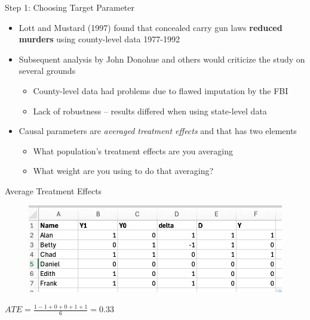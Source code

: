 \documentclass{beamer}
\begin{document}
\begin{frame}{Step 1: Choosing Target Parameter}

\begin{itemize}
\item Lott and Mustard (1997) found that concealed carry gun laws \textbf{reduced murders} using county-level data 1977-1992
\item Subsequent analysis by John Donohue and others would criticize the study on several grounds
	\begin{itemize}
	\item County-level data had problems due to flawed imputation by the FBI
	\item Lack of robustness -- results differed when using state-level data
	\end{itemize}
\item Causal parameters are \emph{averaged treatment effects} and that has two elements
	\begin{itemize}
	\item What population's treatment effects are you averaging
	\item What weight are you using to do that averaging?
	\end{itemize}
\end{itemize}

\end{frame}




\begin{frame}{Average Treatment Effects}

\begin{figure}
    \centering
    \includegraphics[width=\textwidth]{./lecture_includes/step1_table}
\end{figure}

$ATE =  \frac{1-1+0+0+1+1}{6} = 0.33$

\end{frame}
\end{document}
